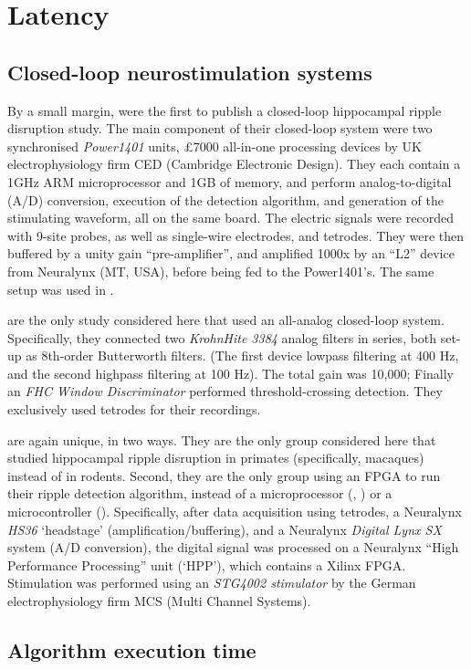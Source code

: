 
\chapter{Latency}


\section{Closed-loop neurostimulation systems}
\label{A:real_systems}


By a small margin,  were the first to publish a closed-loop hippocampal ripple disruption study. The main component of their closed-loop system were two synchronised \emph{Power1401} units, \pounds 7000 all-in-one processing devices by UK electrophysiology firm \textsf{CED (Cambridge Electronic Design)}. They each contain a 1GHz ARM microprocessor and 1GB of memory, and perform analog-to-digital (A/D) conversion, execution of the detection algorithm, and generation of the stimulating waveform, all on the same board. The electric signals were recorded with 9-site probes, as well as single-wire electrodes, and tetrodes. They were then buffered by a unity gain ``pre-amplifier'', and amplified 1000x by an ``L2'' device from \textsf{Neuralynx} (MT, USA), before being fed to the Power1401's. The same setup was used in .

 are the only study considered here that used an all-analog closed-loop system. Specifically, they connected two \emph{KrohnHite 3384} analog filters in series, both set-up as 8th-order Butterworth filters. (The first device lowpass filtering at 400 Hz, and the second highpass filtering at 100 Hz). The total gain was 10,000; Finally an \emph{FHC Window Discriminator} performed threshold-crossing detection. They exclusively used tetrodes for their recordings.

 are again unique, in two ways. They are the only group considered here that studied hippocampal ripple disruption in primates (specifically, macaques) instead of in rodents. Second, they are the only group using an FPGA to run their ripple detection algorithm, instead of a microprocessor (\citeauthor*{Ciliberti2017}, \citeauthor*{Dutta2018}) or a microcontroller (\citeauthor*{Girardeau2009}). Specifically, after data acquisition using tetrodes, a Neuralynx \emph{HS36} `headstage' (amplification/buffering), and a Neuralynx \emph{Digital Lynx SX} system (A/D conversion), the digital signal was processed on a Neuralynx ``High Performance Processing'' unit (`HPP'), which contains a Xilinx FPGA. Stimulation was performed using an \emph{STG4002 stimulator} by the German electrophysiology firm \textsf{MCS (Multi Channel Systems)}.



\section{Algorithm execution time}

